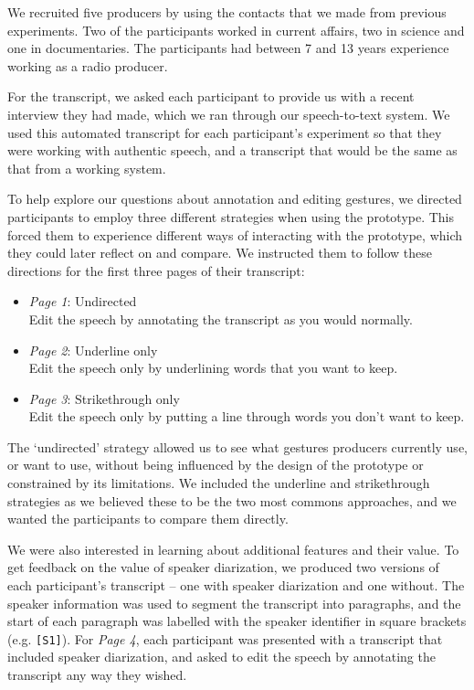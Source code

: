 We recruited five producers by using the contacts that we made from previous experiments. Two of the participants
worked in current affairs, two in science and one in documentaries.  The participants had between 7 and 13 years
experience working as a radio producer.

For the transcript, we asked each participant to provide us with a recent interview they had made, which we ran through
our speech-to-text system. We used this automated transcript for each participant's experiment so that they were
working with authentic speech, and a transcript that would be the same as that from a working system.

To help explore our questions about annotation and editing gestures, we directed participants to employ three different
strategies when using the prototype. This forced them to experience different ways of interacting with the prototype,
which they could later reflect on and compare. We instructed them to follow these directions for the first three
pages of their transcript: 

\begin{itemize}
  \item \textit{Page 1}: Undirected\\Edit the speech by annotating the transcript as you would normally.
  \item \textit{Page 2}: Underline only\\Edit the speech only by underlining words that you want to keep.
  \item \textit{Page 3}: Strikethrough only\\Edit the speech only by putting a line through words you don't want to keep.
\end{itemize}

The `undirected' strategy allowed us to see what gestures producers currently use, or want to use, without being
influenced by the design of the prototype or constrained by its limitations. We included the underline and
strikethrough strategies as we believed these to be the two most commons approaches, and we wanted the participants to
compare them directly.

We were also interested in learning about additional features and their value. To get feedback on the value of speaker
diarization, we produced two versions of each participant's transcript -- one with speaker diarization and one without.
The speaker information was used to segment the transcript into paragraphs, and the start of each paragraph was
labelled with the speaker identifier in square brackets (e.g.  \texttt{{[}S1{]}}).  For \textit{Page 4}, each
participant was presented with a transcript that included speaker diarization, and asked to edit the speech by
annotating the transcript any way they wished.

